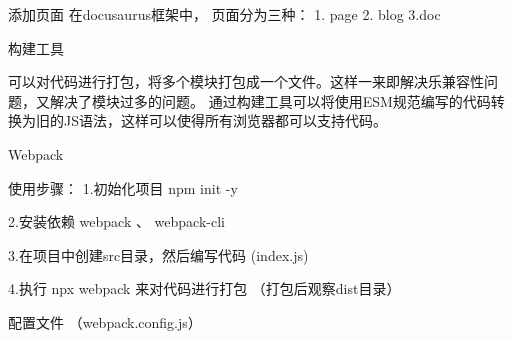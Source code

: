             添加页面
                在docusaurus框架中， 页面分为三种： 1. page 2. blog   3.doc

            构建工具

            可以对代码进行打包，将多个模块打包成一个文件。这样一来即解决乐兼容性问题，又解决了模块过多的问题。
            通过构建工具可以将使用ESM规范编写的代码转换为旧的JS语法，这样可以使得所有浏览器都可以支持代码。

            Webpack

                使用步骤：
                    1.初始化项目    npm init -y

                    2.安装依赖  webpack 、 webpack-cli

                    3.在项目中创建src目录，然后编写代码 (index.js)

                    4.执行 npx webpack 来对代码进行打包 （打包后观察dist目录）

                    配置文件    （webpack.config.js）

